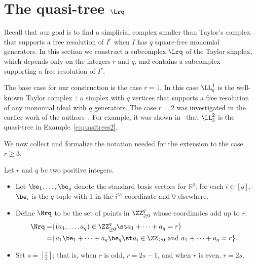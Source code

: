 \section{The quasi-tree \texorpdfstring{$\Lrq$}{Lqr}}
\label{sec:Lrq}

Recall that our goal is to find a simplicial complex smaller than
Taylor's complex that supports a free resolution of $I^r$ when $I$
has $q$ square-free monomial generators. In this section we construct
a subcomplex $\Lrq$ of the Taylor simplex, which depends only on the
integers $r$ and $q$, and contains a subcomplex supporting a free
resolution of $I^r$.

The base case for our construction is the case $r=1$. In this case
$\LL^1_q$ is the well-known Taylor complex~\cite{T}: a simplex with $q$ vertices
that supports a free resolution of any monomial ideal with
$q$ generators.  The case $r=2$ was investigated in the earlier work
of the authors~\cite{L2}. For example, it was shown in~\cite{L2}
that $\LL^2_3$ is the quasi-tree in Example~\ref{e:quasitrees2}.


We now collect and formalize the notation needed for the extension to
the case $r \geq 3$.

\begin{nota} \label{n:rqs}
Let $r$ and $q$ be two positive integers. 

\begin{itemize}
\setlength\itemsep{1em}

\item Let $\be_1, \ldots, \be_q$ denote the standard basis vectors for
$\mathbb R^q$; \ie for each $i\in [q]$, $\be_i$ is the $q$-tuple with 1 in the $i^{th}$
coordinate and 0 elsewhere.


\item Define $\Nrq$ to be the set of points in $ \ZZ_{\ge 0}^q$ whose
coordinates add up to $r$:
\begin{align*}
\Nrq = &\{(a_1,\ldots, a_q) \in \ZZ_{\ge 0}^q \st a_1 + \cdots +
a_q =r\}\\ =&\{a_1\be_1 + \cdots +a_q\be_q \st a_i \in \ZZ_{\ge 0}
{\text{ and }} a_1 + \cdots + a_q =r\}.
\end{align*}


\item Set $s=\left\lceil{\frac{r}{2}}\right\rceil$; that is, when $r$ is odd,
$r=2s-1$, and when $r$ is even, $r=2s$. 
\end{itemize}
\end{nota}


